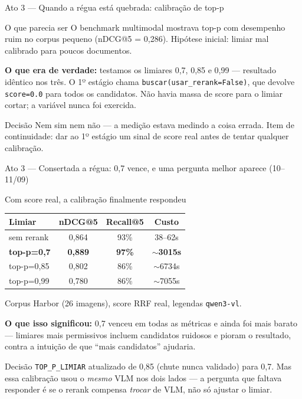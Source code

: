 \documentclass{beamer}
\newenvironment{numerobloco}[1]{\begin{block}{#1}}{\end{block}}
\newenvironment{decisaobloco}[1]{\begin{alertblock}{#1}}{\end{alertblock}}
\begin{document}
\begin{frame}{Ato 3 --- Quando a régua está quebrada: calibração de top-p}
  \small
  \begin{numerobloco}{O que parecia ser}
    O benchmark multimodal mostrava top-p com desempenho ruim no corpus pequeno
    (nDCG@5 = 0,286). Hipótese inicial: limiar mal calibrado para poucos documentos.
  \end{numerobloco}

  \pause
  \textbf{O que era de verdade:} testamos os limiares 0,7, 0,85 e 0,99 --- \alert{resultado
  idêntico nos três}. O 1º estágio chama \texttt{buscar(usar\_rerank=False)}, que devolve
  \texttt{score=0.0} para todos os candidatos. Não havia massa de score para o limiar
  cortar; a variável nunca foi exercida.

  \pause
  \begin{decisaobloco}{Decisão}
    Nem sim nem não --- a medição estava medindo a coisa errada. Item de continuidade:
    dar ao 1º estágio um sinal de score real antes de tentar qualquer calibração.
  \end{decisaobloco}
\end{frame}

\begin{frame}{Ato 3 --- Consertada a régua: 0,7 vence, e uma pergunta melhor aparece (10--11/09)}
  \small
  \begin{numerobloco}{Com score real, a calibração finalmente respondeu}
    \begin{center}
    \footnotesize
    \begin{tabular}{lccc}
      \toprule
      \textbf{Limiar} & \textbf{nDCG@5} & \textbf{Recall@5} & \textbf{Custo} \\
      \midrule
      sem rerank         & 0,864          & 93\%          & 38--62s \\
      \textbf{top-p=0,7} & \textbf{0,889} & \textbf{97\%} & \textbf{$\sim$3015s} \\
      top-p=0,85         & 0,802          & 86\%          & $\sim$6734s \\
      top-p=0,99         & 0,780          & 86\%          & $\sim$7055s \\
      \bottomrule
    \end{tabular}
    \end{center}
    \footnotesize Corpus Harbor (26 imagens), score RRF real, legendas \texttt{qwen3-vl}.
  \end{numerobloco}

  \pause
  \textbf{O que isso significou:} 0,7 venceu em todas as métricas e ainda foi mais barato
  --- limiares mais permissivos incluem candidatos ruidosos e pioram o resultado, contra
  a intuição de que ``mais candidatos'' ajudaria.

  \pause
  \begin{decisaobloco}{Decisão}
    \texttt{TOP\_P\_LIMIAR} atualizado de 0,85 (chute nunca validado) para 0,7. Mas essa
    calibração usou o \emph{mesmo} VLM nos dois lados --- a pergunta que faltava responder
    é se o rerank compensa \emph{trocar} de VLM, não só ajustar o limiar.
  \end{decisaobloco}
\end{frame}
\end{document}
